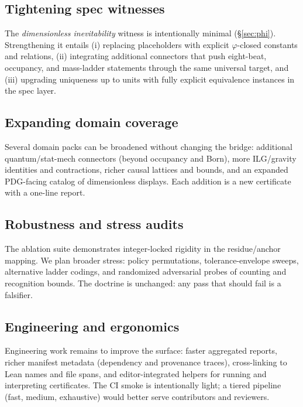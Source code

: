 \documentclass[11pt,a4paper,twoside]{article}
\numberwithin{equation}{section}
\newcommand{\phigr}{\varphi} %
\theoremstyle{customthm}
\theoremstyle{customdef}
\theoremstyle{customrem}
\begin{document}
\subsection{Tightening spec witnesses}\label{subsec:limits-witness}

The \emph{dimensionless inevitability} witness is intentionally minimal (\S\ref{sec:phi}). Strengthening it entails (i) replacing placeholders with explicit \(\phigr\)-closed constants and relations, (ii) integrating additional connectors that push eight-beat, occupancy, and mass-ladder statements through the same universal target, and (iii) upgrading uniqueness up to units with fully explicit equivalence instances in the spec layer.

\subsection{Expanding domain coverage}\label{subsec:limits-coverage}

Several domain packs can be broadened without changing the bridge: additional quantum/stat-mech connectors (beyond occupancy and Born), more ILG/gravity identities and contractions, richer causal lattices and bounds, and an expanded PDG-facing catalog of dimensionless displays. Each addition is a new certificate with a one-line report.

\subsection{Robustness and stress audits}\label{subsec:limits-robustness}

The ablation suite demonstrates integer-locked rigidity in the residue/anchor mapping. We plan broader stress: policy permutations, tolerance-envelope sweeps, alternative ladder codings, and randomized adversarial probes of counting and recognition bounds. The doctrine is unchanged: any pass that should fail is a falsifier.

\subsection{Engineering and ergonomics}\label{subsec:limits-eng}

Engineering work remains to improve the surface: faster aggregated reports, richer manifest metadata (dependency and provenance traces), cross-linking to Lean names and file spans, and editor-integrated helpers for running and interpreting certificates. The CI smoke is intentionally light; a tiered pipeline (fast, medium, exhaustive) would better serve contributors and reviewers.
\end{document}
